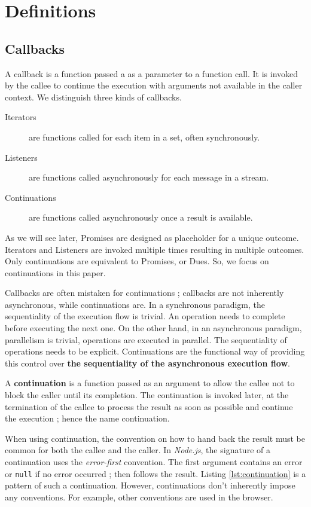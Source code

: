 \section{Definitions} \label{section:definitions}

\subsection{Callbacks} \label{section:definitions:continuation}

A callback is a function passed a as a parameter to a function call.
It is invoked by the callee to continue the execution with arguments not available in the caller context.
We distinguish three kinds of callbacks.

\begin{description}
  \item[Iterators] are functions called for each item in a set, often synchronously.
  \item[Listeners] are functions called asynchronously for each message in a stream.
  \item[Continuations] are functions called asynchronously once a result is available.
\end{description}

As we will see later, Promises are designed as placeholder for a unique outcome.
Iterators and Listeners are invoked multiple times resulting in multiple outcomes.
Only continuations are equivalent to Promises, or Dues.
So, we focus on continuations in this paper.

Callbacks are often mistaken for continuations ; callbacks are not inherently asynchronous, while continuations are.
In a synchronous paradigm, the sequentiality of the execution flow is trivial.
An operation needs to complete before executing the next one.
On the other hand, in an asynchronous paradigm, parallelism is trivial, operations are executed in parallel.
The sequentiality of operations needs to be explicit.
Continuations are the functional way of providing this control over \textbf{the sequentiality of the asynchronous execution flow}.

A \textbf{continuation} is a function passed as an argument to allow the callee not to block the caller until its completion.
The continuation is invoked later, at the termination of the callee to process the result as soon as possible and continue the execution ; hence the name continuation.

When using continuation, the convention on how to hand back the result must be common for both the callee and the caller.
In \textit{Node.js}, the signature of a continuation uses the \textit{error-first} convention.
The first argument contains an error or \texttt{null} if no error occurred ; then follows the result.
Listing \ref{lst:continuation} is a pattern of such a continuation.
However, continuations don't inherently impose any conventions.
For example, other conventions are used in the browser.

